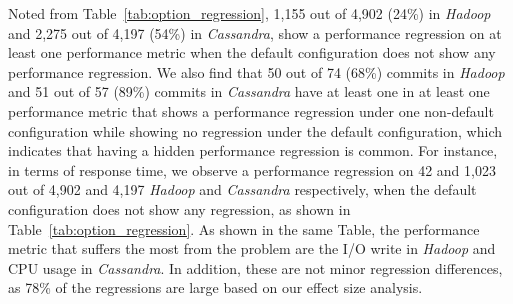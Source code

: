 Noted from Table~\ref{tab:option_regression}, 1,155 out of 4,902 (24\%) \instance in \emph{Hadoop} and 2,275 out of 4,197 (54\%) \instance in \emph{Cassandra}, show a performance regression on at least one performance metric when the default configuration does not show any performance regression. %
We also find that 50 out of 74 (68\%) commits in \emph{Hadoop} and 51 out of 57 (89\%) commits in \emph{Cassandra} have at least one \instance in at least one performance metric that shows a performance regression under one non-default configuration while showing no regression under the default configuration, %
which indicates that having a hidden performance regression is common. %
For instance, in terms of response time, we observe a performance regression on 42 and 1,023 out of 4,902 and 4,197 \emph{Hadoop} and \emph{Cassandra} \instance %
respectively, when the default configuration does not show any regression, as shown in Table~\ref{tab:option_regression}. As shown in the same Table, the performance metric that suffers the most from the \inconsistent problem %
are the I/O write  in \emph{Hadoop} and CPU usage in \emph{Cassandra}. %
In addition, these are not minor regression differences, as 78\% of the regressions are large based on our effect size analysis. 



